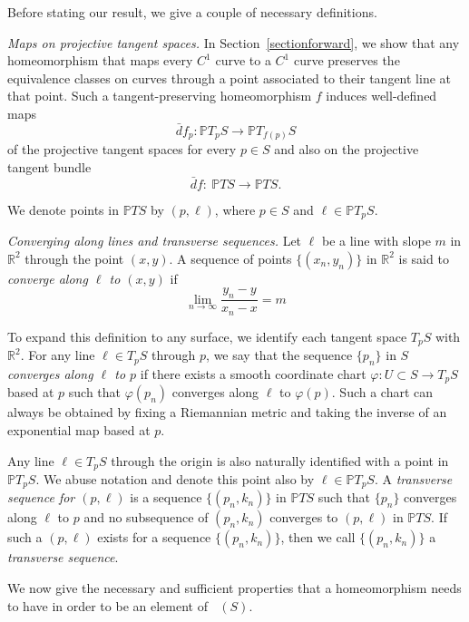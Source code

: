 \documentclass[sn-mathphys-num]{sn-jnl}%
\theoremstyle{thmstyleone}%
\theoremstyle{thmstyletwo}%
\theoremstyle{thmstylethree}%
\DeclareMathOperator{\thomeo}{Homeo^{1}}
\begin{document}
Before stating our result, we give a couple of necessary definitions.

\medskip

\noindent \textit{Maps on projective tangent spaces.}
In Section~\ref{sectionforward}, we show that any homeomorphism that maps every $C^1$ curve to a $C^1$ curve preserves the equivalence classes on curves through a point associated to their tangent line at that point.  Such a tangent-preserving homeomorphism $f$ induces well-defined maps $$\bar{d}f_p: \mathbb{P}T_pS \rightarrow \mathbb{P}T_{f(p)}S$$ of the projective tangent spaces for every $p \in S$ and also on the projective tangent bundle $$\bar{d}f:~\mathbb{P}TS \rightarrow \mathbb{P}TS.$$

\noindent We denote points in $\mathbb{P}TS$ by $(p, \ell)$, where $p \in S$ and $\ell \in \mathbb{P}T_pS$. 

\medskip

\noindent \textit{Converging along lines and transverse sequences. } Let $\ell$ be a line with slope $m$ in $\mathbb{R}^2$ through the point $(x, y)$.  A sequence of points $\{(x_n, y_n)\}$ in $\mathbb{R}^2$ is said to \emph{converge along  $\ell$ to $(x, y)$} if 
$$\lim_{n \rightarrow \infty} \frac{y_n - y}{x_n - x} = m$$

To expand this definition to any surface, we identify each tangent space $T_pS$ with $\mathbb{R}^2$.   For any line $\ell \in T_pS$ through $p$,  we say that the sequence $\{p_n\}$ in $S$ \emph{converges along $\ell$ to $p$} if there exists a smooth coordinate chart $\varphi: U \subset S \rightarrow T_pS$ based at $p$ such that $\varphi(p_n)$ converges along $\ell$ to $\varphi(p)$.  Such a chart can always be obtained by fixing a Riemannian metric and taking the inverse of an exponential map based at $p$. 

Any line $\ell \in T_pS$ through the origin is also naturally identified with a point in $\mathbb{P}T_pS$.  We abuse notation and denote this point also by $\ell \in \mathbb{P}T_pS$.  A \emph{transverse sequence for $(p, \ell)$} is a sequence $\{(p_n, k_n)\}$ in $\mathbb{P}TS$ such that $\{p_n\}$  converges along $\ell$ to $p$ and no subsequence of $(p_n, k_n)$ converges to $(p, \ell)$ in $\mathbb{P}TS$.  If such a $(p, \ell)$ exists for a sequence $\{(p_n, k_n)\}$, then we call $\{(p_n, k_n)\}$ a \emph{transverse sequence}.

\medskip

\noindent We now give the necessary and sufficient properties that a homeomorphism needs to have in order to be an element of $\thomeo(S)$.
\end{document}
